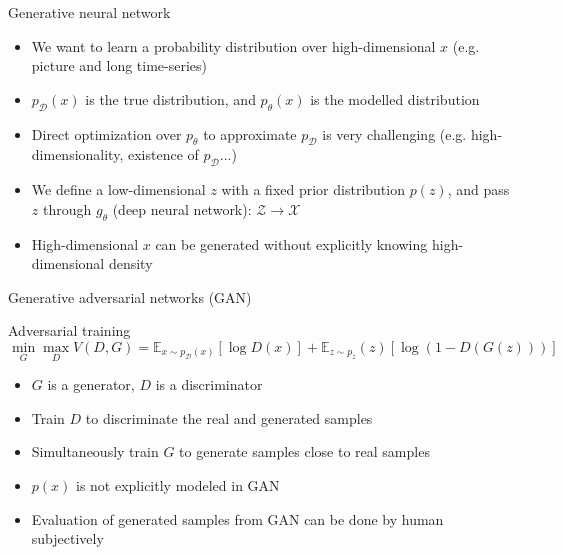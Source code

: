 \documentclass [aspectratio=169]{beamer}
\begin{document}
\begin{frame}{Generative neural network}
    \begin{itemize}
        \item We want to learn a probability distribution over high-dimensional $x$ (e.g. picture and long time-series)
        \item $p_{\mathcal{D}}(x)$ is the true distribution, and $p_{\theta}(x)$ is the modelled distribution
        \item Direct optimization over $p_{\theta}$ to approximate $p_{\mathcal{D}}$ is very challenging (e.g. high-dimensionality, existence of $p_{\mathcal{D}}$...)
        \item We define a low-dimensional $z$ with a fixed prior distribution $p(z)$, and pass $z$ through $g_{\theta}$ (deep neural network): $\mathcal{Z} \rightarrow \mathcal{X}$
        \item High-dimensional $x$ can be generated without explicitly knowing high-dimensional density
    \end{itemize}
\end{frame}

\begin{frame}{Generative adversarial networks (GAN)}
    \begin{block}{Adversarial training}
        \begin{equation*}
            \min _{G} \max _{D} V(D, G)=\mathbb{E}_{{x} \sim p_{\mathcal { D }}({x})}[\log D({x})]+\mathbb{E}_{{z} \sim p_{{z}}}({z})[\log (1-D(G({z})))]
        \end{equation*}
    \end{block}
    \begin{itemize}
        \item $G$ is a generator, $D$ is a discriminator
        \item Train $D$ to discriminate the real and generated samples
        \item Simultaneously train $G$ to generate samples close to real samples
        \item $p(x)$ is not explicitly modeled in GAN
        \item Evaluation of generated samples from GAN can be done by human subjectively
    \end{itemize}
\end{frame}
\end{document}
